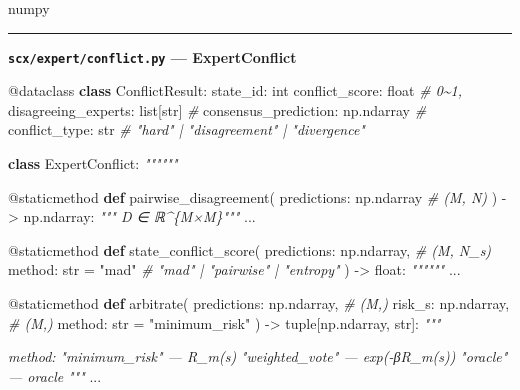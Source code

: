 \documentclass[
  12pt,
]{article}
\newenvironment{Shaded}{}{}
\newcommand{\AttributeTok}[1]{\textcolor[rgb]{0.49,0.56,0.16}{#1}}
\newcommand{\BuiltInTok}[1]{\textcolor[rgb]{0.00,0.50,0.00}{#1}}
\newcommand{\CommentTok}[1]{\textcolor[rgb]{0.38,0.63,0.69}{\textit{#1}}}
\newcommand{\KeywordTok}[1]{\textcolor[rgb]{0.00,0.44,0.13}{\textbf{#1}}}
\newcommand{\NormalTok}[1]{#1}
\newcommand{\OperatorTok}[1]{\textcolor[rgb]{0.40,0.40,0.40}{#1}}
\newcommand{\StringTok}[1]{\textcolor[rgb]{0.25,0.44,0.63}{#1}}
\begin{document}
numpy

\begin{center}\rule{0.5\linewidth}{0.5pt}\end{center}

\textbf{\texttt{scx/expert/conflict.py} --- ExpertConflict}



\begin{Shaded}
\begin{Highlighting}[]
\AttributeTok{@dataclass}
\KeywordTok{class}\NormalTok{ ConflictResult:}
\NormalTok{    state\_id: }\BuiltInTok{int}
\NormalTok{    conflict\_score: }\BuiltInTok{float}               \CommentTok{\# 0\textasciitilde{}1, }
\NormalTok{    disagreeing\_experts: }\BuiltInTok{list}\NormalTok{[}\BuiltInTok{str}\NormalTok{]      }\CommentTok{\# }
\NormalTok{    consensus\_prediction: np.ndarray    }\CommentTok{\# }
\NormalTok{    conflict\_type: }\BuiltInTok{str}                  \CommentTok{\# "hard" | "disagreement" | "divergence"}

\KeywordTok{class}\NormalTok{ ExpertConflict:}
    \CommentTok{""""""}

    \AttributeTok{@staticmethod}
    \KeywordTok{def}\NormalTok{ pairwise\_disagreement(}
\NormalTok{        predictions: np.ndarray       }\CommentTok{\# (M, N) }
\NormalTok{    ) }\OperatorTok{{-}\textgreater{}}\NormalTok{ np.ndarray:}
        \CommentTok{""" D ∈ ℝ\^{}\{M×M\}"""}
\NormalTok{        ...}

    \AttributeTok{@staticmethod}
    \KeywordTok{def}\NormalTok{ state\_conflict\_score(}
\NormalTok{        predictions: np.ndarray,      }\CommentTok{\# (M, N\_s) }
\NormalTok{        method: }\BuiltInTok{str} \OperatorTok{=} \StringTok{"mad"}           \CommentTok{\# "mad" | "pairwise" | "entropy"}
\NormalTok{    ) }\OperatorTok{{-}\textgreater{}} \BuiltInTok{float}\NormalTok{:}
        \CommentTok{""""""}
\NormalTok{        ...}

    \AttributeTok{@staticmethod}
    \KeywordTok{def}\NormalTok{ arbitrate(}
\NormalTok{        predictions: np.ndarray,       }\CommentTok{\# (M,)}
\NormalTok{        risk\_s: np.ndarray,            }\CommentTok{\# (M,) }
\NormalTok{        method: }\BuiltInTok{str} \OperatorTok{=} \StringTok{"minimum\_risk"}
\NormalTok{    ) }\OperatorTok{{-}\textgreater{}} \BuiltInTok{tuple}\NormalTok{[np.ndarray, }\BuiltInTok{str}\NormalTok{]:}
        \CommentTok{"""}

\CommentTok{        method:}
\CommentTok{            "minimum\_risk" —  R\_m(s) }
\CommentTok{            "weighted\_vote" —  exp({-}βR\_m(s)) }
\CommentTok{            "oracle" —  oracle }
\CommentTok{        """}
\NormalTok{        ...}


\end{Highlighting}
\end{Shaded}
\end{document}
